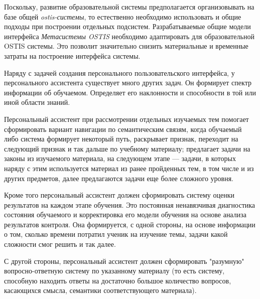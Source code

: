 Поскольку, развитие образовательной системы предполагается организовывать на базе
общей \textit{ostis-системы}, то естественно необходимо использовать и общие подходы при построении отдельных подсистем. Разрабатываемые общие модели интерфейса \textit{Метасистемы OSTIS} необходимо адаптировать для образовательной OSTIS системы. Это позволит значительно снизить материальные и временные затраты на построение интерфейса системы.

Наряду с задачей создания персонального пользовательского интерфейса, у персонального ассистента существует много других задач. Он формирует спектр информации об обучаемом. Определяет его наклонности и способности в той или иной области знаний.

Персональный ассистент при рассмотрении отдельных изучаемых тем помогает сформировать вариант навигации по семантическим связям, когда обучаемый либо система формирует некоторый путь, раскрывает признак, переходит на следующий признак и так дальше по учебному материалу; предлагает задачи на законы из изучаемого материала, на следующем этапе --- задачи, в которых наряду с этим используется материал из ранее пройденных тем, в том числе и из других предметов, далее предлагаются задачи еще более сложного уровня. 

Кроме того персональный ассистент должен сформировать систему оценки результатов на каждом этапе обучения. Это постоянная ненавязчивая диагностика состояния обучаемого и корректировка его модели обучения на основе анализа результатов контроля. Она формируется, с одной стороны, на основе информации о том, сколько времени потратил ученик на изучение темы, задачи какой сложности смог решить и так далее.

С другой стороны, персональный ассистент должен сформировать "разумную"{} вопросно-ответную систему по указанному материалу (то есть систему, способную находить ответы на достаточно большое количество вопросов, касающихся смысла, семантики соответствующего материала).

